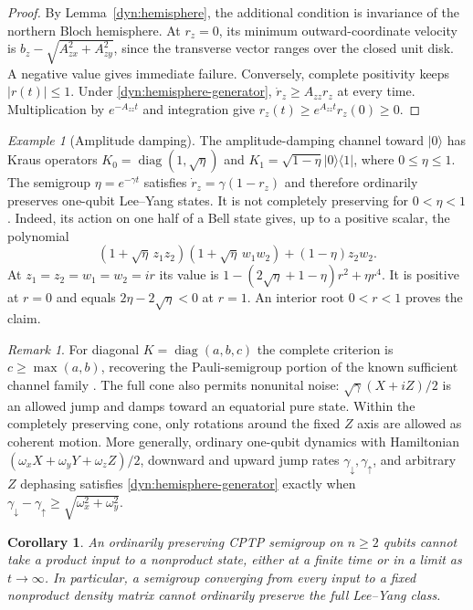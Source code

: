 \documentclass[reqno]{amsart}
\newtheorem{corollary}[theorem]{Corollary}
\theoremstyle{definition}
\theoremstyle{remark}
\newtheorem{remark}[theorem]{Remark}
\newtheorem{example}[theorem]{Example}
\DeclareMathOperator{\diag}{diag}
\begin{document}
\begin{proof}
By Lemma~\ref{dyn:hemisphere}, the additional condition is invariance of
the northern Bloch hemisphere.  At $r_z=0$, its minimum outward-coordinate
velocity is $b_z-\sqrt{A_{zx}^2+A_{zy}^2}$, since the transverse vector
ranges over the closed unit disk.  A negative value gives immediate
failure.  Conversely, complete positivity keeps $|r(t)|\le1$.
Under \eqref{dyn:hemisphere-generator},
$\dot r_z\ge A_{zz}r_z$ at every time.  Multiplication by
$e^{-A_{zz}t}$ and integration give
$r_z(t)\ge e^{A_{zz}t}r_z(0)\ge0$.
\end{proof}

\begin{example}[Amplitude damping]\label{dyn:amplitude-damping}
The amplitude-damping channel toward $|0\rangle$ has Kraus operators
$K_0=\diag(1,\sqrt\eta)$ and
$K_1=\sqrt{1-\eta}|0\rangle\langle1|$, where $0\le\eta\le1$.
The semigroup $\eta=e^{-\gamma t}$ satisfies
$\dot r_z=\gamma(1-r_z)$ and therefore ordinarily preserves one-qubit
Lee--Yang states.  It is not completely preserving for $0<\eta<1$.
Indeed, its action on one half of a Bell state gives, up to a positive
scalar, the polynomial
\[
 (1+\sqrt\eta\,z_1z_2)(1+\sqrt\eta\,w_1w_2)
 +(1-\eta)z_2w_2.
\]
At $z_1=z_2=w_1=w_2=ir$ its value is
$1-(2\sqrt\eta+1-\eta)r^2+\eta r^4$.
It is positive at $r=0$ and equals $2\eta-2\sqrt\eta<0$ at $r=1$.
An interior root $0<r<1$ proves the claim.
\end{example}

\begin{remark}\label{dyn:rates}
For diagonal $K=\diag(a,b,c)$ the complete criterion is
$c\ge\max(a,b)$, recovering the Pauli-semigroup portion of the known
sufficient channel family \cite[Theorem~3]{WBG26}. The full cone also permits
nonunital noise: $\sqrt\gamma(X+iZ)/2$ is an allowed jump and damps
toward an equatorial pure state. Within the completely preserving cone,
only rotations around the fixed $Z$
axis are allowed as coherent motion.  More generally, ordinary
one-qubit dynamics with Hamiltonian
$(\omega_xX+\omega_yY+\omega_zZ)/2$, downward and upward jump rates
$\gamma_\downarrow,\gamma_\uparrow$, and arbitrary $Z$ dephasing
satisfies \eqref{dyn:hemisphere-generator} exactly when
$\gamma_\downarrow-\gamma_\uparrow\ge
\sqrt{\omega_x^2+\omega_y^2}$.
\end{remark}

\begin{corollary}\label{dyn:no-correlated-preparation}
An ordinarily preserving CPTP semigroup on $n\ge2$ qubits cannot take a
product input to a nonproduct state, either at a finite time or in a limit
as $t\to\infty$.  In particular, a semigroup converging from every input
to a fixed nonproduct density matrix cannot ordinarily preserve the full
Lee--Yang class.
\end{corollary}
\end{document}
